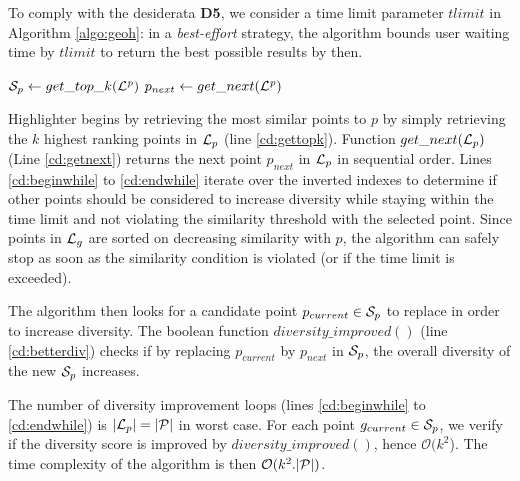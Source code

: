 To comply with the desiderata {\bf D5}, we consider a time limit parameter $tlimit$ in Algorithm \ref{algo:geoh}: in a {\em best-effort} strategy, the algorithm bounds user waiting time by $tlimit$ to return the best possible results by then.

\begin{algorithm}
\DontPrintSemicolon
{}
${\cal S}_p \gets get\_top\_k(\mathit{{\cal L}^p})$\;\label{cd:gettopk}
$p_{next} \gets get\_next(\mathit{{\cal L}^p})$\;\label{cd:getnext}
\label{cd:endwhile}
\; 
\caption{{\sc Highlighter} Algorithm}
\label{algo:geoh}
\end{algorithm}


{\sc Highlighter} begins by retrieving the most similar points to $p$ by simply retrieving the $k$ highest ranking points in ${\cal L}_p$ (line \ref{cd:gettopk}). Function $get\_next({\cal L}_p)$ (Line \ref{cd:getnext}) returns the next point $p_{next}$ in ${\cal L}_p$ in sequential order. Lines \ref{cd:beginwhile} to \ref{cd:endwhile} iterate over the inverted indexes to determine if other points should be considered to increase diversity while staying within the time limit and not violating the similarity threshold with the selected point. Since points in ${\cal L}_g$ are sorted on decreasing similarity with $p$, the algorithm can safely stop as soon as the similarity condition is violated (or if the time limit is exceeded).

The algorithm then looks for a candidate point $p_{current} \in {\cal S}_p$ to replace in order to increase diversity. The boolean function $\mathit{diversity\_improved}()$ (line \ref{cd:betterdiv}) checks if by replacing $p_{current}$ by $p_{next}$ in ${\cal S}_p$, the overall diversity of the new ${\cal S}_p$ increases.

\vspace{5pt}
 The number of diversity improvement loops (lines \ref{cd:beginwhile} to \ref{cd:endwhile}) is $|{\cal L}_p| = |{\cal P}|$ in worst case. For each point $g_{current} \in {\cal S}_p$, we verify if the diversity score is improved by $\mathit{diversity\_improved}()$, hence $\mathcal{O}(k^2$). The time complexity of the algorithm is then $\mathcal{O}(k^2.|{\cal P}|)$.